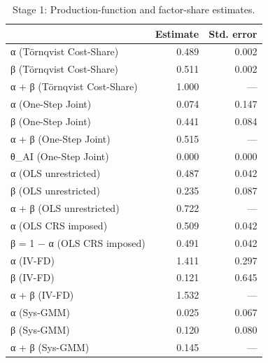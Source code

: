 \begin{table}[t]
\centering\small
\begin{tabular}{lrr}
\toprule
 & Estimate & Std. error \\
\midrule
α (Törnqvist Cost-Share) & 0.489 & 0.002 \\
β (Törnqvist Cost-Share) & 0.511 & 0.002 \\
α + β (Törnqvist Cost-Share) & 1.000 & --- \\
α (One-Step Joint) & 0.074 & 0.147 \\
β (One-Step Joint) & 0.441 & 0.084 \\
α + β (One-Step Joint) & 0.515 & --- \\
θ\_AI (One-Step Joint) & 0.000 & 0.000 \\
α (OLS unrestricted) & 0.487 & 0.042 \\
β (OLS unrestricted) & 0.235 & 0.087 \\
α + β (OLS unrestricted) & 0.722 & --- \\
α (OLS CRS imposed) & 0.509 & 0.042 \\
β = 1 − α (OLS CRS imposed) & 0.491 & 0.042 \\
α (IV-FD) & 1.411 & 0.297 \\
β (IV-FD) & 0.121 & 0.645 \\
α + β (IV-FD) & 1.532 & --- \\
α (Sys-GMM) & 0.025 & 0.067 \\
β (Sys-GMM) & 0.120 & 0.080 \\
α + β (Sys-GMM) & 0.145 & --- \\
\bottomrule
\end{tabular}
\caption{Stage 1: Production-function and factor-share estimates.}
\label{tab:pf}
\end{table}